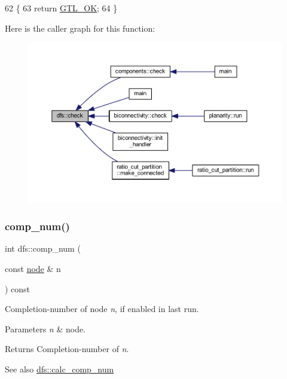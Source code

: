 \begin{DoxyCode}
62 \{
63     \textcolor{keywordflow}{return} \mbox{\hyperlink{classalgorithm_af1a0078e153aa99c24f9bdf0d97f6710a5114c20e4a96a76b5de9f28bf15e282b}{GTL\_OK}};
64 \}
\end{DoxyCode}
Here is the caller graph for this function\+:\nopagebreak
\begin{figure}[H]
\begin{center}
\leavevmode
\includegraphics[width=350pt]{classdfs_a1af70060897529e67910f589b047e576_icgraph}
\end{center}
\end{figure}
\mbox{\label{classdfs_aceb066c806cb0beb5688b167a17387c7}} 
\subsubsection{\texorpdfstring{comp\+\_\+num()}{comp\_num()}}
{\footnotesize\ttfamily int dfs\+::comp\+\_\+num (\begin{DoxyParamCaption}\item[{const \mbox{\hyperlink{classnode}{node}} \&}]{n }\end{DoxyParamCaption}) const\hspace{0.3cm}{\ttfamily [inline]}}



Completion-\/number of node {\itshape n}, if enabled in last run. 


\begin{DoxyParams}{Parameters}
{\em n} & node. \\
\hline
\end{DoxyParams}
\begin{DoxyReturn}{Returns}
Completion-\/number of {\itshape n}. 
\end{DoxyReturn}
\begin{DoxySeeAlso}{See also}
\mbox{\hyperlink{classdfs_a70862ea715c52eb95fb704afd3a6e676}{dfs\+::calc\+\_\+comp\+\_\+num}} 
\end{DoxySeeAlso}


